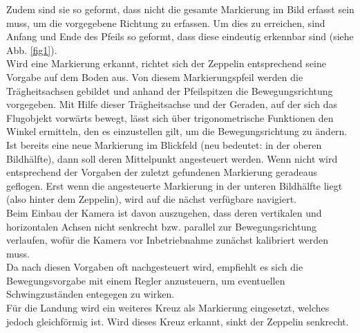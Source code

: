 \documentclass{ezb}
\begin{document}
Zudem sind sie so geformt, dass nicht die gesamte Markierung im Bild erfasst sein muss, um die vorgegebene Richtung zu erfassen. Um dies zu erreichen, sind Anfang und Ende des Pfeils so geformt, dass diese eindeutig erkennbar sind (siehe Abb. \ref{fig1}).\\ 
\linebreak
Wird eine Markierung erkannt, richtet sich der Zeppelin entsprechend seine Vorgabe auf dem Boden aus. Von diesem Markierungspfeil werden die Trägheitsachsen gebildet und anhand der Pfeilspitzen die Bewegungsrichtung vorgegeben. Mit Hilfe dieser Trägheitsachse und der Geraden, auf der sich das Flugobjekt vorwärts bewegt, lässt sich über trigonometrische Funktionen den Winkel ermitteln, den es einzustellen gilt, um die Bewegungsrichtung zu ändern. Ist bereits eine neue Markierung im Blickfeld (neu bedeutet: in der oberen Bildhälfte), dann soll deren Mittelpunkt angesteuert werden. Wenn nicht wird entsprechend der Vorgaben der zuletzt gefundenen Markierung geradeaus geflogen. Erst wenn die angesteuerte Markierung in der unteren Bildhälfte liegt (also hinter dem Zeppelin), wird auf die nächst verfügbare navigiert.\\
\linebreak 
Beim Einbau der Kamera ist davon auszugehen, dass deren vertikalen und horizontalen Achsen nicht senkrecht bzw. parallel zur Bewegungsrichtung verlaufen, wofür die Kamera vor Inbetriebnahme zunächst kalibriert werden muss.\\
\linebreak
Da nach diesen Vorgaben oft nachgesteuert wird, empfiehlt es sich die Bewegungsvorgabe mit einem Regler anzusteuern, um eventuellen Schwingzuständen entegegen zu wirken.    \\ 
\linebreak
Für die Landung wird ein weiteres Kreuz als Markierung eingesetzt, welches jedoch gleichförmig ist. Wird dieses Kreuz erkannt, sinkt der Zeppelin senkrecht.
\end{document}
